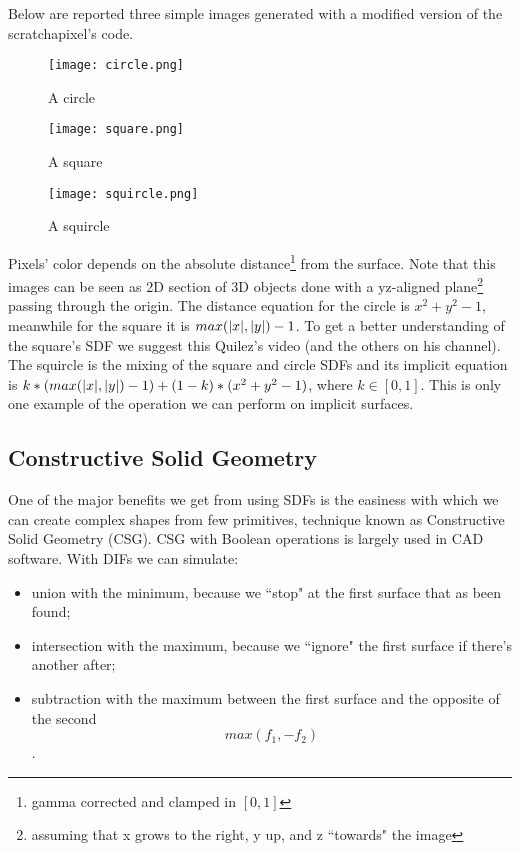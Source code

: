 Below are reported three simple images generated with a modified version of the scratchapixel's code\cite{scratch_sdf}.
\begin{figure}[!htb]
  \texttt{[image: circle.png]}
  \caption{A circle}\label{fig:circle}
\endminipage\hfill
{}
  \texttt{[image: square.png]}
  \caption{A square}\label{fig:square}
\endminipage\hfill
{}%
  \texttt{[image: squircle.png]}
  \caption{A squircle}\label{fig:squircle}
\endminipage
\end{figure}
Pixels' color depends on the absolute distance\footnote{gamma corrected and clamped in $[0,1]$} from the surface.
Note that this images can be seen as 2D section of 3D objects done with a yz-aligned plane\footnote{assuming that x grows to the right, y up, and z ``towards" the image} passing through the origin.
The distance equation for the circle is $x^2 + y^2 - 1$, meanwhile for the square it is $max(\lvert x \lvert, \lvert y \lvert) - 1$.
To get a better understanding of the square's SDF we suggest this Quilez's video \cite{iquilez_sdf_box} (and the others on his channel).
The squircle is the mixing of the square and circle SDFs and its implicit equation is
$ k * (max(\lvert x \lvert, \lvert y \lvert) - 1) + (1-k) * (x^2 + y^2 - 1) $, where $k \in [0,1]$.
This is only one example of the operation we can perform on implicit surfaces.


\subsection{Constructive Solid Geometry}
One of the major benefits we get from using SDFs is the easiness with which we can create complex shapes from few primitives, technique known as Constructive Solid Geometry (CSG).
CSG with Boolean operations is largely used in CAD software.
With DIFs we can simulate:
\begin{itemize}
  \item union with the minimum, because we ``stop" at the first surface that as been found;
  \item intersection with the maximum, because we ``ignore" the first surface if there's another after;
  \item subtraction with the maximum between the first surface and the opposite of the second
    $$ max(f_1, -f_2) $$.
\end{itemize}

